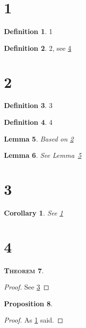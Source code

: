 \documentclass{article}
\newtheorem{thm}{\textsc{Theorem}}[subsection]
\newtheorem{lem}[thm]{Lemma}
\newtheorem{prop}[thm]{Proposition}
\newtheorem{cor}{Corollary}[thm]
\theoremstyle{definition}
\newtheorem{defn}[thm]{Definition}
\newcommand{\fref}[1]{\ref{#1}}
\newcommand{\reflem}[1]{Lemma~\ref{#1}}
\begin{document}
\section{1}

\begin{defn}
	\label{def:1}
	1
\end{defn}

\begin{defn}
        \label{def:2}
        2, see \fref{def:4}
\end{defn}

\section{2}

\begin{defn}
	\label{def:3}
	3
\end{defn}

\begin{defn}
        \label{def:4}
        4
\end{defn}

\begin{lem}
        \label{lem:bar}
        Based on \ref{def:2}
\end{lem}

\begin{lem}
        \label{lem:foo}
        See \reflem{lem:bar}
\end{lem}

\section{3}

\begin{cor}
	\label{cor:back1}
	See \ref{def:1}
\end{cor}

\section{4}

\begin{thm}
	\label{thm:back3}
\end{thm}
\begin{proof}
	See \ref{def:3}
\end{proof}

\begin{prop}
	\label{prop:backcor}
\end{prop}
\begin{proof}
	As \ref{cor:back1} said.
\end{proof}
\end{document}
